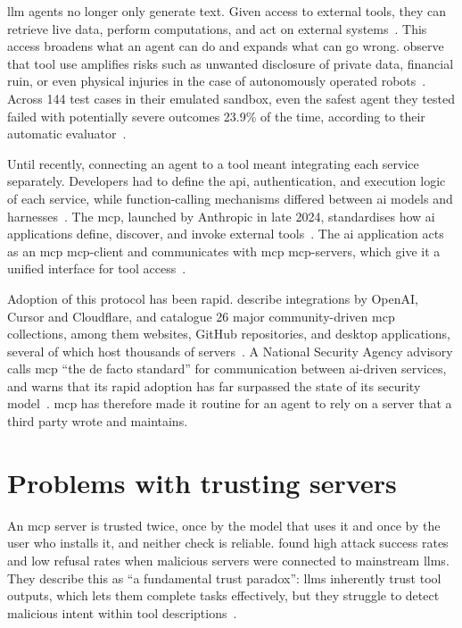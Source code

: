 \Gls{llm} \glspl{agent} no longer only generate text. Given access to external tools, they can retrieve live data, perform computations, and act on external systems~\cite[p.~2]{Hou2026}. This access broadens what an agent can do and expands what can go wrong. \textcite{Ruan2024} observe that tool use amplifies risks such as unwanted disclosure of private data, financial ruin, or even physical injuries in the case of autonomously operated robots~\cite[p.~1]{Ruan2024}. Across 144 test cases in their emulated sandbox, even the safest agent they tested failed with potentially severe outcomes 23.9\% of the time, according to their automatic evaluator~\cite[p.~2]{Ruan2024}.

Until recently, connecting an agent to a tool meant integrating each service separately. Developers had to define the \gls{api}, authentication, and execution logic of each service, while function-calling mechanisms differed between \gls{ai} models and harnesses~\cite[p.~2]{Hou2026}. The \gls{mcp}, launched by Anthropic in late 2024, standardises how \gls{ai} applications define, discover, and invoke external tools~\cite[p.~2]{Hou2026}. The \gls{ai} application acts as an \gls{mcp} \gls{mcp-client} and communicates with \gls{mcp} \glspl{mcp-server}, which give it a unified interface for tool access~\cite[p.~4]{Hou2026}.

Adoption of this protocol has been rapid. \textcite{Hou2026} describe integrations by OpenAI, Cursor and Cloudflare, and catalogue 26 major community-driven \gls{mcp} collections, among them websites, GitHub repositories, and desktop applications, several of which host thousands of servers~\cite[pp.~11--13]{Hou2026}. A National Security Agency advisory calls \gls{mcp} \enquote{the de facto standard} for communication between \gls{ai}-driven services, and warns that its rapid adoption has far surpassed the state of its security model~\cite[p.~1]{NSA2026}. \Gls{mcp} has therefore made it routine for an agent to rely on a server that a third party wrote and maintains.

\section{Problems with trusting  servers}\label{sec:untrusted-server}

An \gls{mcp} server is trusted twice, once by the model that uses it and once by the user who installs it, and neither check is reliable. \textcite{Song2026} found high attack success rates and low refusal rates when malicious servers were connected to mainstream \glspl{llm}. They describe this as \enquote{a fundamental trust paradox}: \glspl{llm} inherently trust tool outputs, which lets them complete tasks effectively, but they struggle to detect malicious intent within tool descriptions~\cite[p.~2423]{Song2026}.

